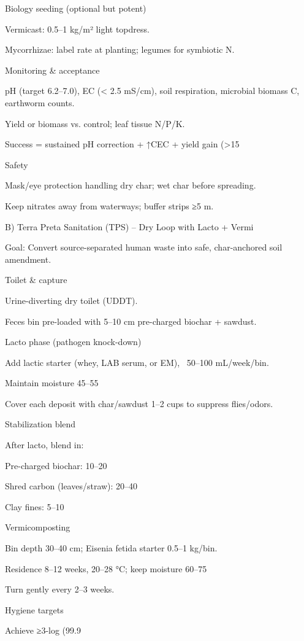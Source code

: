 \documentclass{article}
\begin{document}
Biology seeding (optional but potent)

Vermicast: 0.5–1 kg/m² light topdress.

Mycorrhizae: label rate at planting; legumes for symbiotic N.


Monitoring \& acceptance

pH (target 6.2–7.0), EC (< 2.5 mS/cm), soil respiration, microbial biomass C, earthworm counts.

Yield or biomass vs. control; leaf tissue N/P/K.

Success = sustained pH correction + ↑CEC + yield gain (>15%


Safety

Mask/eye protection handling dry char; wet char before spreading.

Keep nitrates away from waterways; buffer strips ≥5 m.


B) Terra Preta Sanitation (TPS) – Dry Loop with Lacto + Vermi

Goal: Convert source-separated human waste into safe, char-anchored soil amendment.

Toilet \& capture

Urine-diverting dry toilet (UDDT).

Feces bin pre-loaded with 5–10 cm pre-charged biochar + sawdust.


Lacto phase (pathogen knock-down)

Add lactic starter (whey, LAB serum, or EM), ~50–100 mL/week/bin.

Maintain moisture 45–55%

Cover each deposit with char/sawdust 1–2 cups to suppress flies/odors.


Stabilization blend

After lacto, blend in:

Pre-charged biochar: 10–20%

Shred carbon (leaves/straw): 20–40%

Clay fines: 5–10%



Vermicomposting

Bin depth 30–40 cm; Eisenia fetida starter 0.5–1 kg/bin.

Residence 8–12 weeks, 20–28 °C; keep moisture 60–75%

Turn gently every 2–3 weeks.


Hygiene targets

Achieve ≥3-log (99.9%
\end{document}
